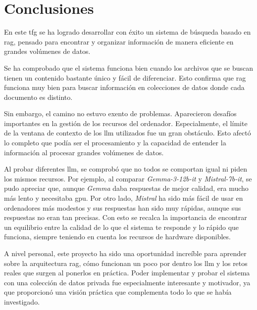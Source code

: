 
\chapter{Conclusiones}
\label{conclusiones}

En este \gls{tfg} se ha logrado desarrollar con éxito un sistema de búsqueda basado en \gls{rag}, pensado para encontrar y organizar información de manera eficiente en grandes volúmenes de datos.

Se ha comprobado que el sistema funciona bien cuando los archivos que se buscan tienen un contenido bastante único y fácil de diferenciar. Esto confirma que \gls{rag} funciona muy bien para buscar información en colecciones de datos donde cada documento es distinto.

Sin embargo, el camino no estuvo exento de problemas. Aparecieron desafíos importantes en la gestión de los recursos del ordenador. Especialmente, el límite de la ventana de contexto de los \gls{llm} utilizados fue un gran obstáculo. Esto afectó lo completo que podía ser el procesamiento y la capacidad de entender la información al procesar grandes volúmenes de datos.

Al probar diferentes \gls{llm}, se comprobó que no todos se comportan igual ni piden los mismos recursos. Por ejemplo, al comparar \textit{Gemma-3-12b-it} y \textit{Mistral-7b-it}, se pudo apreciar que, aunque \textit{Gemma} daba respuestas de mejor calidad, era mucho más lento y necesitaba \gls{gpu}. Por otro lado, \textit{Mistral} ha sido más fácil de usar en ordenadores más modestos y sus respuestas han sido muy rápidas, aunque sus respuestas no eran tan precisas. Con esto se recalca la importancia de encontrar un equilibrio entre la calidad de lo que el sistema te responde y lo rápido que funciona, siempre teniendo en cuenta los recursos de hardware disponibles.

A nivel personal, este proyecto ha sido una oportunidad increíble para aprender sobre la arquitectura \gls{rag}, cómo funcionan un poco por dentro los \gls{llm} y los retos reales que surgen al ponerlos en práctica. Poder implementar y probar el sistema con una colección de datos privada fue especialmente interesante y motivador, ya que proporcionó una visión práctica que complementa todo lo que se había investigado.

